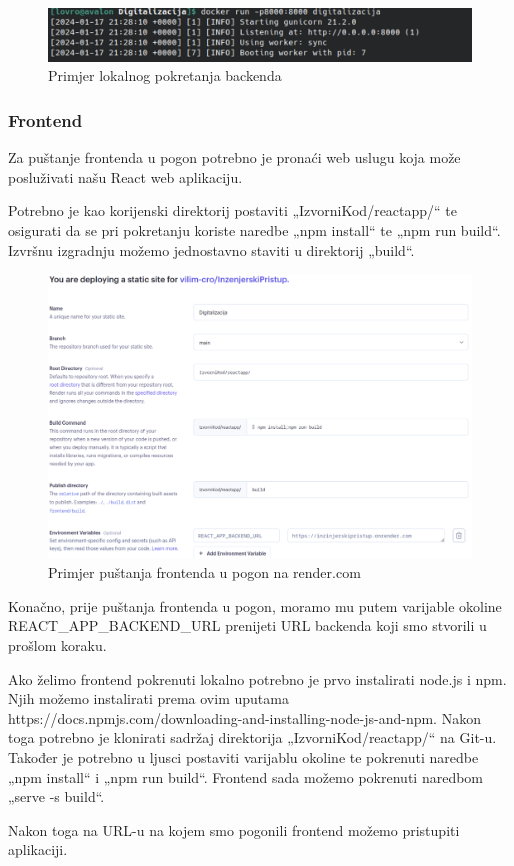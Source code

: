 			\begin{figure}[H]
				\includegraphics[width=\textwidth]{slike/runBackendLocal.png}
				\caption{Primjer lokalnog pokretanja backenda}
				\label{fig:lokalno-pokretanje-backenda}
			\end{figure}


			\subsubsection{Frontend}

			Za puštanje frontenda u pogon potrebno je pronaći web uslugu koja može posluživati našu React web aplikaciju.

			Potrebno je kao korijenski direktorij postaviti „IzvorniKod/reactapp/“ te osigurati da se pri pokretanju koriste
			naredbe „npm install“ te „npm run build“. Izvršnu izgradnju možemo jednostavno staviti u direktorij „build“. 

			\begin{figure}[H]
				\includegraphics[width=\textwidth]{slike/deployingFrontend.png}
				\caption{Primjer puštanja frontenda u pogon na render.com}
				\label{fig:lokalno-pokretanje-backenda}
			\end{figure}

			Konačno, prije puštanja frontenda u pogon, moramo mu putem varijable okoline REACT_APP_BACKEND_URL prenijeti URL
			backenda koji smo stvorili u prošlom koraku.

			Ako želimo frontend pokrenuti lokalno potrebno je prvo instalirati node.js i npm. Njih možemo instalirati prema ovim
			uputama https://docs.npmjs.com/downloading-and-installing-node-js-and-npm.
			Nakon toga potrebno je klonirati sadržaj direktorija „IzvorniKod/reactapp/“ na Git-u. Također je potrebno u ljusci
			postaviti varijablu okoline te pokrenuti naredbe „npm install“ i „npm run build“. Frontend sada možemo pokrenuti
			naredbom „serve -s build“. 

			Nakon toga na URL-u na kojem smo pogonili frontend možemo pristupiti aplikaciji.
			
			\eject 
